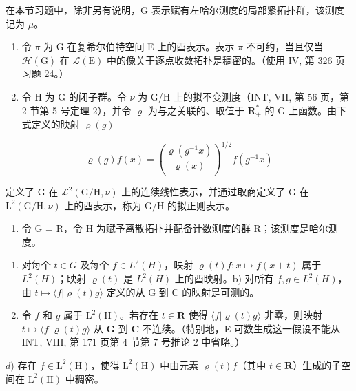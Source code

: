 \exercisesection{}

在本节习题中，除非另有说明，G 表示赋有左哈尔测度的局部紧拓扑群，该测度记为 \(\mu\)。

\begin{enumerate}
\def\labelenumi{\arabic{enumi})}
\item
  令 \(\pi\) 为 G 在复希尔伯特空间 E 上的酉表示。表示 \(\pi\) 不可约，当且仅当 \(\mathcal{H}(\mathrm{G})\) 在 \(\mathcal{L}(\mathrm{E})\) 中的像关于逐点收敛拓扑是稠密的。（使用 IV, 第 326 页习题 24。）
\item
  令 H 为 G 的闭子群。令 \(\nu\) 为 G/H 上的拟不变测度（INT, VII, 第 56 页，第 2 节第 5 号定理 2），并令 \(\varrho\) 为与之关联的、取值于 \(\mathbf{R}_{+}^{*}\) 的 G 上函数。由下式定义的映射 \(\varrho(g)\)
\end{enumerate}

\[
\varrho (g) f (x) = \left(\frac {\varrho (g ^ {- 1} x)}{\varrho (x)}\right) ^ {1 / 2} f (g ^ {- 1} x)
\]

定义了 G 在 \(\mathcal{L}^{2}(\mathrm{G / H},\nu)\) 上的连续线性表示，并通过取商定义了 G 在 \(\mathrm{L}^2 (\mathrm{G / H},\nu)\) 上的酉表示，称为 \(\mathrm{G / H}\) 的拟正则表示。

\begin{enumerate}
\def\labelenumi{\arabic{enumi})}
\setcounter{enumi}{2}
\tightlist
\item
  令 G = R，令 H 为赋予离散拓扑并配备计数测度的群 R；该测度是哈尔测度。
\end{enumerate}

\begin{enumerate}
\def\labelenumi{\alph{enumi})}
\item
  对每个 \(t \in G\) 及每个 \(f \in L^{2}(H)\)，映射 \(\varrho(t)f: x \mapsto f(x + t)\) 属于 \(L^{2}(H)\)；映射 \(\varrho(t)\) 是 \(L^{2}(H)\) 上的酉映射。b) 对所有 \(f,g \in L^{2}(H)\)，由 \(t \mapsto \langle f | \varrho(t)g \rangle\) 定义的从 G 到 C 的映射是可测的。
\item
  令 \(f\) 和 \(g\) 属于 \(\mathrm{L}^2(\mathrm{H})\)。若存在 \(t \in \mathbf{R}\) 使得 \(\langle f | \varrho(t)g \rangle\) 非零，则映射 \(t \mapsto \langle f | \varrho(t)g \rangle\) 从 \(\mathbf{G}\) 到 \(\mathbf{C}\) 不连续。（特别地，E 可数生成这一假设不能从 INT, VIII, 第 171 页第 4 节第 7 号推论 2 中省略。）
\end{enumerate}

\(d)\) 存在 \(f \in \mathrm{L}^2(\mathrm{H})\)，使得 \(\mathrm{L}^2(\mathrm{H})\) 中由元素 \(\varrho(t)f\)（其中 \(t \in \mathbf{R}\)）生成的子空间在 \(\mathrm{L}^2(\mathrm{H})\) 中稠密。

